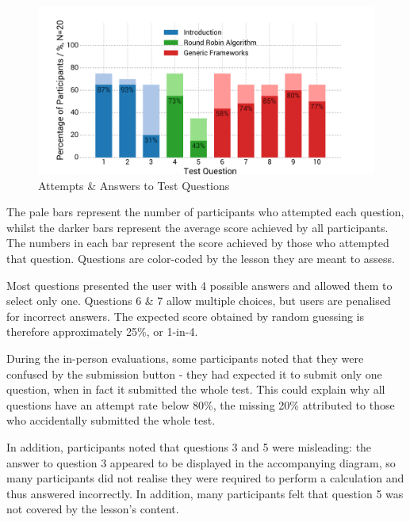 \documentclass[bsc,twoside,singlespacing,parskip,logo,notimes,normalheadings]{infthesis}
\begin{document}
    \begin{figure}[!tb]
      \centering
      \vspace{-6mm}
      \includegraphics[width=\textwidth, trim=0 0 30 20, clip]{img/question_scores.pdf}
      \captionsetup{width=\textwidth, justification=centering}
      \caption{Attempts \& Answers to Test Questions}\label{fig:question-answers}
    \end{figure}

    The pale bars represent the number of participants who attempted
    each question, whilst the darker bars represent the average score
    achieved by all participants. The numbers in each bar represent
    the score achieved by those who attempted that question. Questions
    are color-coded by the lesson they are meant to assess.

    Most questions presented the user with 4 possible answers and
    allowed them to select only one. Questions 6 \& 7 allow multiple
    choices, but users are penalised for incorrect answers. The
    expected score obtained by random guessing is therefore
    approximately 25\%, or 1-in-4.

    During the in-person evaluations, some participants noted that
    they were confused by the submission button - they had expected it
    to submit only one question, when in fact it submitted the whole
    test. This could explain why all questions have an attempt rate
    below 80\%, the missing 20\% attributed to those who accidentally
    submitted the whole test.

    In addition, participants noted that questions 3 and 5 were
    misleading: the answer to question 3 appeared to be displayed in
    the accompanying diagram, so many participants did not realise
    they were required to perform a calculation and thus answered
    incorrectly. In addition, many participants felt that question 5
    was not covered by the lesson's content.
\end{document}
